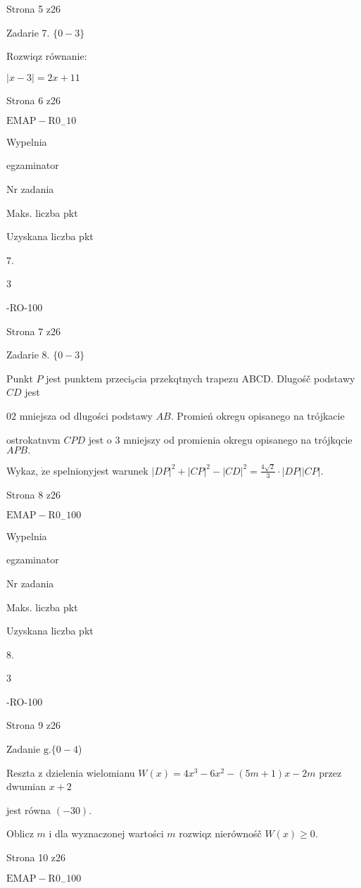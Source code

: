 \documentclass[a4paper,12pt]{article}
\begin{document}
Strona 5 z26





Zadarie 7. $\{0-3\}$

Rozwiqz równanie:

$|x-3|=2x+11$

Strona 6 z26

$\mathrm{E}\mathrm{M}\mathrm{A}\mathrm{P}-\mathrm{R}0_{-}10$





Wypelnia

egzaminator

Nr zadania

Maks. liczba pkt

Uzyskana liczba pkt

7.

3

-RO-100

Strona 7 z26





Zadarie 8. $\{0-3\}$

Punkt $P$ jest punktem $\mathrm{p}\mathrm{r}\mathrm{z}\mathrm{e}\mathrm{c}\mathrm{i}_{9}\mathrm{c}\mathrm{i}\mathrm{a}$ przekqtnych trapezu ABCD. Dlugośč podstawy $CD$ jest

$0 2$ mniejsza od dlugości podstawy $AB$. Promień okregu opisanego na trójkacie

ostrokatnvm $CPD$ jest o 3 mniejszy od promienia okregu opisanego na trójkqcie $APB.$

Wykaz, $\dot{\mathrm{z}}\mathrm{e}$ spelnionyjest warunek $|DP|^{2}+|CP|^{2}-|CD|^{2}=\displaystyle \frac{4\sqrt{2}}{3}\cdot|DP| |CP|.$

Strona 8 z26

$\mathrm{E}\mathrm{M}\mathrm{A}\mathrm{P}-\mathrm{R}0_{-}100$





Wypelnia

egzaminator

Nr zadania

Maks. liczba pkt

Uzyskana liczba pkt

8.

3

-RO-100

Strona 9 z26





Zadanie $\mathrm{g}. \{0-4$)

Reszta z dzielenia wielomianu $W(x)=4x^{3}-6x^{2}-(5m+1)x-2m$ przez dwumian $x+2$

jest równa $(-30).$

Oblicz $m$ i dla wyznaczonej wartości $m$ rozwiqz nierównośč $W(x)\geq 0.$

Strona 10 z26

$\mathrm{E}\mathrm{M}\mathrm{A}\mathrm{P}-\mathrm{R}0_{-}100$
\end{document}
